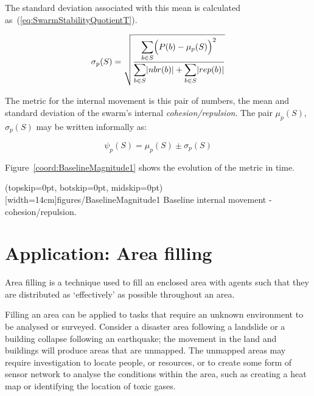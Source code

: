 \documentclass{ieeeaccess}
\begin{document}
The standard deviation associated with this mean is calculated as~(\ref{eq:SwarmStabilityQuotientT}).

\begin{equation}
\label{eq:SwarmStabilityQuotientT}
\sigma_p(S) = \sqrt{\frac{\mathlarger{\sum_{b \in S}}\Big(P(b)-\mu_p(S)\Big)^2}{\mathlarger{\sum_{b \in S}}|nbr(b)| + \mathlarger{\sum_{b \in S}}|rep(b)|}}
\end{equation}

The metric for the internal movement is this pair of numbers, the mean and standard deviation of the swarm's internal \emph{cohesion/repulsion}. The pair $\mu_p(S)$, $\sigma_p(S)$ may be written informally as: 

\begin{equation}
\label{eq:SwarmPotentialMagnitude}
\psi_p(S) = \mu_p(S)\pm \sigma_p(S)
\end{equation}

Figure~\ref{coord:BaselineMagnitude1} shows the evolution of the metric in time.

\Figure[t!](topskip=0pt, botskip=0pt, midskip=0pt)[width=14cm]{figures/BaselineMagnitude1}
{Baseline internal movement - cohesion/repulsion.\label{coord:BaselineMagnitude1}}


\section{Application: Area filling}\label{metric:ApplicationFloodFilling}

Area filling is a technique used to fill an enclosed area with agents such that they are distributed as `effectively' as possible throughout an area. 

Filling an area can be applied to tasks that require an unknown environment to be analysed or surveyed. Consider a disaster area following a landslide or a building collapse following an earthquake; the movement in the land and buildings will produce areas that are unmapped. The unmapped areas may require investigation to locate people, or resources, or to create some form of sensor network to analyse the conditions within the area, such as creating a heat map or identifying the location of toxic gases. 
\end{document}
